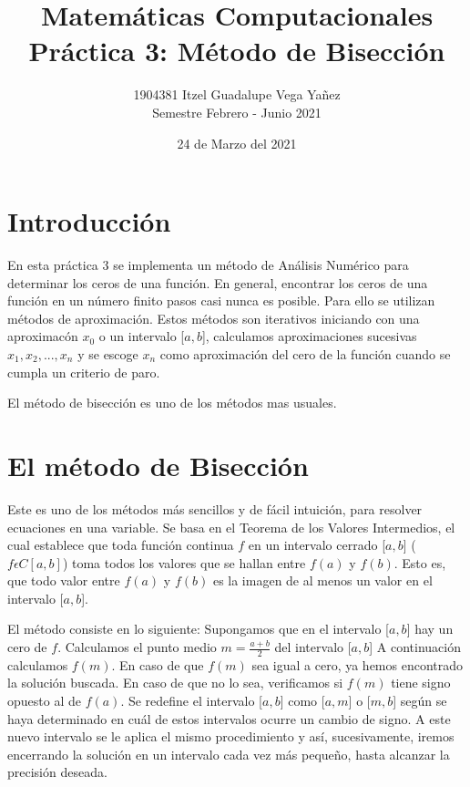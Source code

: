 \documentclass[12pt,a4paper]{article}
\title{Matemáticas Computacionales \\ Práctica 3: Método de Bisección}
\author{1904381 Itzel Guadalupe Vega Yañez \\ Semestre Febrero - Junio 2021}
\date{24 de Marzo del 2021}
\begin{document}
\maketitle

\section{Introducci\'{o}n}\label{sec:intro}

\onehalfspacing
En esta práctica 3 se implementa un método de Análisis Numérico para determinar los ceros de una función. En general, encontrar los ceros de una función en un número finito pasos casi nunca es posible. Para ello se utilizan métodos de aproximación. Estos métodos son iterativos iniciando con una aproximacón $x_{0}$ o un intervalo [$a, b$], calculamos aproximaciones sucesivas $x_{1}, x_{2},..., x_{n}$ y se escoge $x_{n}$ como aproximación del cero de la función cuando se cumpla un criterio de paro.

El método de bisección es uno de los métodos mas usuales.\citep{metodosnumericos}

\section{El m\'{e}todo de Bisecci\'{o}n} \label{sec:metodobiseccion}

\onehalfspacing
Este es uno de los métodos más sencillos y de fácil intuición, para resolver ecuaciones en una variable. Se basa en el Teorema de los Valores Intermedios, el cual establece que toda función continua $f$ en un intervalo cerrado [$a,b$] ($f \epsilon C[a,b]$) toma todos los valores que se hallan entre $f(a)$ y $f(b)$. Esto es, que todo valor entre $f(a)$ y $f(b)$ es la imagen de al menos un valor en el intervalo [$a,b$]. 


El método consiste en lo siguiente: Supongamos que en el intervalo [$a,b$] hay un cero de $f$. Calculamos el punto medio $m=\frac{a+b}{2}$ del intervalo [$a,b$] A continuación calculamos $f(m)$. En caso de que $f(m)$ sea igual a cero, ya hemos encontrado la solución buscada. En caso de que no lo sea, verificamos si $f(m)$ tiene signo opuesto al de $f(a)$. Se redefine el intervalo [$a,b$] como [$a,m$] o [$m,b$] según se haya determinado en cuál de estos intervalos ocurre un cambio de signo. A este nuevo intervalo se le aplica el mismo procedimiento y así, sucesivamente, iremos encerrando la solución en un intervalo cada vez más pequeño, hasta alcanzar la precisión deseada.\citep{repositorio}
\end{document}
